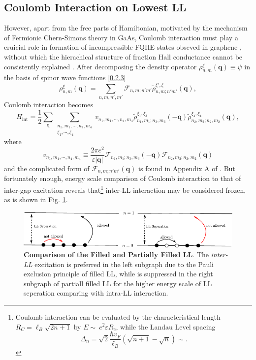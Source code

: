 \documentclass[bachelor,english,numbers]{ustcthesis}
\begin{document}
	\subsection{Coulomb Interaction on Lowest LL}
		\indent\par However, apart from the free parts of Hamiltonian, motivated by the mechanism of Fermionic Chern-Simons theory in GaAs, Coulomb interaction must play a cruicial role in formation of incompressible FQHE states obseved in graphene \cite{bolotin2009observation}, without which the hierachical structure of fraction Hall conductance cannot be consistently explained \cite{simon1998chern,lopez1991fractional}. After decomposing the density operator $\rho^{\xi}_{n,m}(\bm{q})\equiv\psi$ in the basis of spinor wave functions \eqref{0.2.3}
		\begin{equation*}
			\rho^{\xi}_{n,m}(\bm{q})=\sum_{n,m,n',m'}\mathcal{F}_{n,m;n'm'}\widetilde{\rho}^{\xi',\xi}_{n,m;n'm'}(\bm{q}),
		\end{equation*}
		Coulomb interaction becomes
		\begin{equation*}
		 	H_{\text{int}}=\dfrac{1}{2}\sum_{\bm{q}}\sum_{\substack{n_1,m_1,\cdots,n_4,m_4\\\xi_1,\cdots,\xi_4}}v_{n_1,m_1,\cdots,n_4,m_4}\widetilde{\rho}_{n_1,m_1;n_3,m_3}^{\xi_1,\xi_3}(\bm{-q})\widetilde{\rho}_{n_2,m_2;n_2,m_2}^{\xi_4,\xi_4}(\bm{q}),
		\end{equation*}
		where
		\begin{equation*}
			v_{n_1,m_1,\cdots,n_4,m_4}\equiv\frac{2\pi e^2}{\varepsilon |\bm{q}|}\mathcal{F}_{n_1,m_1;n_3,m_3}(-\bm{q})\mathcal{F}_{n_2,m_2;n_2,m_2}(\bm{q})
		\end{equation*}
		and the complicated form of $\mathcal{F}_{n,m;n'm'}(\bm{q})$ is found in Appendix A of \cite{goerbig2011electronic}. But fortunately enough, energy scale comparison of Coulomb interaction to that of inter-gap excitation reveals that\footnote{Coulomb interaction can be evaluated by the characteristical length $R_C=\ell_B\sqrt{2n+1}$ by $E\sim\ e^2\varepsilon R_c$, while the Landau Level spacing
		\begin{equation*}
			\Delta_n=\sqrt{2}\dfrac{\hbar v_F}{\ell_B}(\sqrt{n+1}-\sqrt{n})\sim.
		\end{equation*}} inter-LL interaction may be considered frozen, as is shown in 
		Fig. \ref{fig:1}.
		\begin{figure}[!htp]
			\centering
			\includegraphics[scale=1.1]{LL.pdf}
			\caption{{\bf Comparison of the Filled and Partially Filled LL}. The \emph{inter-LL} excitation is preferred in the left subgraph due to the Pauli exclusion principle of filled LL, while is suppressed in the right subgraph of partiall filled LL for the higher energy scale of LL seperation comparing with intra-LL interaction.}
			\label{fig:1}
		\end{figure}
		 
\end{document}
